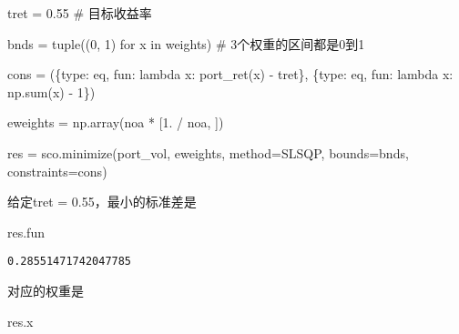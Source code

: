 \documentclass[
  letterpaper,
  DIV=11,
  numbers=noendperiod]{scrreprt}
\newenvironment{Shaded}{\begin{snugshade}}{\end{snugshade}}
\newcommand{\BuiltInTok}[1]{\textcolor[rgb]{0.00,0.23,0.31}{#1}}
\newcommand{\CommentTok}[1]{\textcolor[rgb]{0.37,0.37,0.37}{#1}}
\newcommand{\ControlFlowTok}[1]{\textcolor[rgb]{0.00,0.23,0.31}{#1}}
\newcommand{\DecValTok}[1]{\textcolor[rgb]{0.68,0.00,0.00}{#1}}
\newcommand{\FloatTok}[1]{\textcolor[rgb]{0.68,0.00,0.00}{#1}}
\newcommand{\KeywordTok}[1]{\textcolor[rgb]{0.00,0.23,0.31}{#1}}
\newcommand{\NormalTok}[1]{\textcolor[rgb]{0.00,0.23,0.31}{#1}}
\newcommand{\OperatorTok}[1]{\textcolor[rgb]{0.37,0.37,0.37}{#1}}
\newcommand{\StringTok}[1]{\textcolor[rgb]{0.13,0.47,0.30}{#1}}
\begin{document}
\begin{Shaded}
\begin{Highlighting}[]
\NormalTok{tret }\OperatorTok{=} \FloatTok{0.55}  \CommentTok{\# 目标收益率}

\NormalTok{bnds }\OperatorTok{=} \BuiltInTok{tuple}\NormalTok{((}\DecValTok{0}\NormalTok{, }\DecValTok{1}\NormalTok{) }\ControlFlowTok{for}\NormalTok{ x }\KeywordTok{in}\NormalTok{ weights)  }\CommentTok{\# 3个权重的区间都是0到1}

\NormalTok{cons }\OperatorTok{=}\NormalTok{ (\{}\StringTok{\textquotesingle{}type\textquotesingle{}}\NormalTok{: }\StringTok{\textquotesingle{}eq\textquotesingle{}}\NormalTok{, }\StringTok{\textquotesingle{}fun\textquotesingle{}}\NormalTok{: }\KeywordTok{lambda}\NormalTok{ x: port\_ret(x) }\OperatorTok{{-}}\NormalTok{ tret\},}
\NormalTok{        \{}\StringTok{\textquotesingle{}type\textquotesingle{}}\NormalTok{: }\StringTok{\textquotesingle{}eq\textquotesingle{}}\NormalTok{, }\StringTok{\textquotesingle{}fun\textquotesingle{}}\NormalTok{: }\KeywordTok{lambda}\NormalTok{ x: np.}\BuiltInTok{sum}\NormalTok{(x) }\OperatorTok{{-}} \DecValTok{1}\NormalTok{\})}

\NormalTok{eweights }\OperatorTok{=}\NormalTok{ np.array(noa }\OperatorTok{*}\NormalTok{ [}\FloatTok{1.} \OperatorTok{/}\NormalTok{ noa, ])}

\NormalTok{res }\OperatorTok{=}\NormalTok{ sco.minimize(port\_vol, eweights, method}\OperatorTok{=}\StringTok{\textquotesingle{}SLSQP\textquotesingle{}}\NormalTok{,}
\NormalTok{                   bounds}\OperatorTok{=}\NormalTok{bnds, constraints}\OperatorTok{=}\NormalTok{cons)}
\end{Highlighting}
\end{Shaded}

给定tret = 0.55，最小的标准差是

\begin{Shaded}
\begin{Highlighting}[]
\NormalTok{res.fun}
\end{Highlighting}
\end{Shaded}

\begin{verbatim}
0.28551471742047785
\end{verbatim}

对应的权重是

\begin{Shaded}
\begin{Highlighting}[]
\NormalTok{res.x}
\end{Highlighting}
\end{Shaded}
\end{document}

